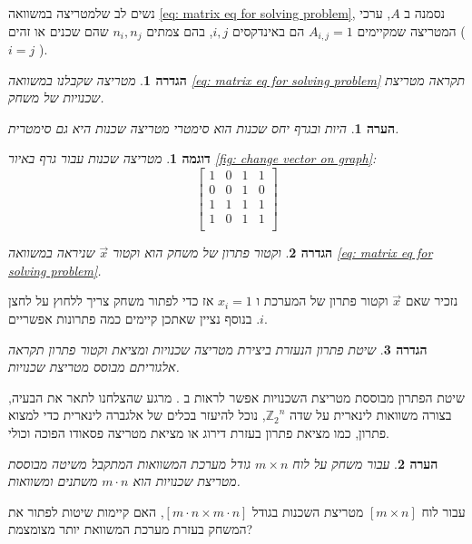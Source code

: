 \documentclass[12pt,leqno]{article}
\theoremstyle{theoremdd}
\newtheorem{definition}{הגדרה}[section]
\newtheorem{example}{דוגמה}[section]
\newtheorem{comm}{הערה}[section]
\newcommand{\Zn}{{\mathbb{Z}_2}^n}
\begin{document}
נשים לב שלמטריצה
במשוואה
\ref{eq: matrix eq for solving problem},
נסמנה 
ב 
$A$,
ערכי המטריצה 
שמקיימים
$A_{i,j} = 1$
הם 
באינדקסים 
$i, j$,
בהם 
צמתים
$n_i, n_j$
שהם שכנים או זהים
(
$i = j$
).
\begin{definition}
    \label{def: neighbor matrix}
    מטריצה 
    שקבלנו במשוואה
    \ref{eq: matrix eq for solving problem}
    תקראה מטריצת שכנויות של משחק.
\end{definition}
\begin{comm}
    \label{comm: symetic matrix}
    היות ובגרף יחס שכנות הוא סימטרי מטריצה שכנות היא גם סימטרית.
\end{comm}
\begin{example}
    מטריצה שכנות עבור גרף באיור 
\ref{fig: change vector on graph}:
\[
    \begin{bmatrix}
        1 & 0 & 1 & 1\\
        0 & 0 & 1 & 0\\
        1 & 1 & 1 & 1\\
        1 & 0 & 1 & 1\\
    \end{bmatrix}
\]
\end{example}
\begin{definition}
    \label{ def: solution vector}
    וקטור פתרון של משחק 
    הוא וקטור
    $\vec{x}$
    שניראה
    במשוואה 
    \ref{eq: matrix eq for solving problem}.
\end{definition}
נזכיר שאם
$\vec{x}$
וקטור פתרון של המערכת 
ו
$x_i = 1$
אז כדי לפתור משחק
צריך ללחוץ על לחצן 
$i$.
בנוסף 
נציין שאתכן קיימים כמה פתרונות אפשריים.
\begin{definition}
    \label{def: standard solution}
    שיטת פתרון הנעזרת ביצירת מטריצה שכנויות 
    ומציאת וקטור פתרון
    תקראה
    אלגוריתם מבוסס מטריצת שכנויות.
\end{definition}
שיטת הפתרון מבוססת מטריצת השכנויות 
אפשר לראות ב
\cite{B2}.
מרגע שהצלחנו לתאר את הבעיה,
בצורה 
משוואות לינארית
על שדה
$\Zn$,
נוכל להיעזר בכלים של אלגברה לינארית
כדי למצוא פתרון,
כמו מציאת פתרון בעזרת דירוג
או
מציאת מטריצה פסאודו הפוכה וכולי. 
\begin{comm}
    \label{comm: for board too many variables}
    עבור משחק על לוח 
    $m \times n$
    גודל מערכת המשוואות המתקבל משיטה 
    מבוססת מטריצת שכנויות 
    הוא 
    $m \cdot n$
    משתנים ומשוואות.
\end{comm}
עבור לוח 
$[ m \times n ]$
מטריצת השכנות בגודל 
$[ m \cdot n \times m \cdot n ]$,
האם קיימות שיטות לפתור את המשחק בעזרת מערכת המשוואת
יותר מצומצמת?
\end{document}
